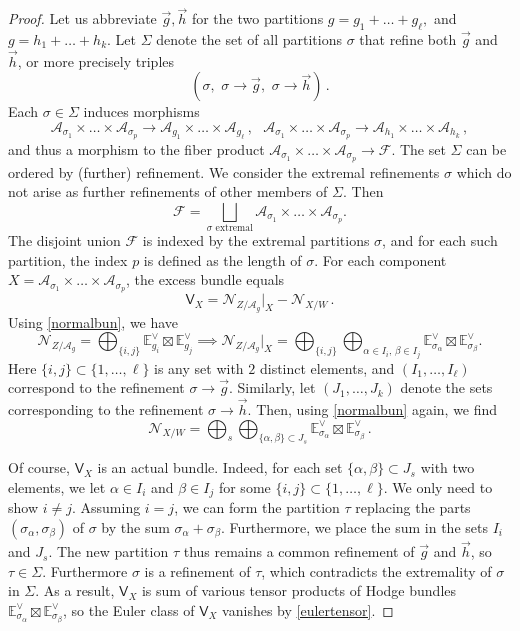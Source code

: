 \documentclass[11pt]{amsart}
\theoremstyle{definition}
\newcommand{\A}{\mathcal{A}}
\begin{document}
{\begin{proof}
Let us abbreviate $\vec g, \vec h$ for the two partitions $g=g_1+\ldots+g_{\ell},$ and $g=h_1+\ldots+h_{k}.$ Let $\Sigma$ denote the set of all partitions $\sigma$ that refine both $\vec g$ and $\vec h$, or more precisely triples $$(\sigma,\,\, \sigma \to \vec g,\,\, \sigma\to \vec h)\,.$$ Each $\sigma\in \Sigma$ induces morphisms $$\A_{\sigma_1} \times \ldots\times \A_{\sigma_{p}}\to \A_{g_1}\times \ldots \times \A_{g_\ell}\, , \ \ \ \A_{\sigma_1} \times \ldots \times \A_{\sigma_{p}}\to \A_{h_1}\times \ldots \times \A_{h_k}\,,$$ and thus a morphism to the fiber product $\A_{\sigma_1} \times \ldots\times \A_{\sigma_{p}}\to \mathcal F.$ 
The set $\Sigma$ can be ordered by (further) refinement. We consider the extremal refinements $\sigma$ which do not arise as further refinements of other members of $\Sigma$. Then $$\mathcal F=\bigsqcup_{\sigma \text{ extremal}} \A_{\sigma_1}\times \ldots \times \A_{\sigma_p}.$$ The disjoint union $\mathcal F$ is indexed by the extremal partitions $\sigma$, and for each such partition, the index $p$ is defined as the length of $\sigma$. For each component $X=\A_{\sigma_1}\times \ldots \times \A_{\sigma_p}$, the excess bundle equals
$$\mathsf {V}_X=\mathcal N_{Z/\A_g}\bigg|_X - \mathcal N_{X/W}\,.$$ Using \eqref{normalbun}, we have $$\mathcal N_{Z/\A_g}=\bigoplus_{\{i,j\}} \mathbb E_{g_i}^{\vee} \boxtimes \mathbb E_{g_j}^{\vee}\implies \mathcal N_{Z/\A_g}\bigg|_{X}=\bigoplus_{\{i,j\}} \bigoplus_{\alpha \in I_i, \,\beta\in I_j} \mathbb E_{\sigma_{\alpha}}^{\vee} \boxtimes \mathbb E_{\sigma_{\beta}}^{\vee}.$$ Here $\{i, j\}\subset \{1, \ldots, \ell\}$ is any set with $2$ distinct elements, and $(I_1, \ldots, I_\ell)$ correspond to the refinement $\sigma \to \vec g.$ Similarly, let $(J_1, \ldots, J_k)$ denote the sets corresponding to the refinement $\sigma \to \vec h.$ Then, using \eqref{normalbun} again, we find  
$$\mathcal N_{X/W}=\bigoplus_{s} \bigoplus_{\{\alpha, \beta\} \subset J_s} \mathbb E_{\sigma_{\alpha}}^{\vee}\boxtimes \mathbb E_{\sigma_{\beta}}^{\vee}\, .$$ 

Of course, $\mathsf {V}_X$ is an actual bundle. Indeed, for each set $\{\alpha,\beta\}\subset J_s$ with two elements, we let $\alpha \in I_i$ and $\beta\in I_j$ for some $\{i, j\}\subset \{1, \ldots, \ell\}$. We only need to show $i\neq j$. Assuming $i=j$, we can form the partition $\tau$ replacing the parts $(\sigma_\alpha, \sigma_\beta)$ of $\sigma$ by the sum  $\sigma_\alpha+\sigma_\beta$. Furthermore, we place the sum in the sets $I_i$ and $J_s$. The new partition $\tau$ thus remains a common refinement of $\vec g$ and $\vec h$, so $\tau\in \Sigma$. Furthermore $\sigma$ is a refinement of $\tau$, which contradicts  the
extremality of $\sigma$ in $\Sigma$. As a result, $\mathsf{V}_X$ is sum of various tensor products of Hodge bundles $\mathbb E_{\sigma_\alpha}^{\vee}\boxtimes \mathbb E_{\sigma_\beta}^{\vee}$, so the Euler class of $\mathsf{V}_X$ vanishes by \eqref{eulertensor}. \end{proof}

}
\end{document}
